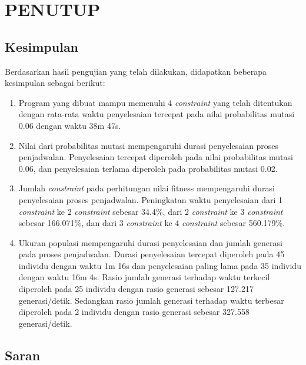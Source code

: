 \chapter{PENUTUP}
\label{chap:penutup}


\section{Kesimpulan}
\label{sec:kesimpulan}

Berdasarkan hasil pengujian yang telah dilakukan, didapatkan beberapa kesimpulan \linebreak sebagai berikut:

\begin{enumerate}[nolistsep]

  \item Program yang dibuat mampu memenuhi 4 \textit{\textit{constraint}} yang telah ditentukan dengan rata-rata waktu penyelesaian tercepat pada nilai probabilitas mutasi 0.06 dengan waktu 38m 47s.
  \item Nilai dari probabilitas mutasi mempengaruhi durasi penyelesaian proses penjadwalan. 
        Penyelesaian tercepat diperoleh pada nilai probabilitas mutasi 0.06, dan penyelesaian terlama diperoleh pada probabilitas mutasi 0.02. 
  \item Jumlah \textit{constraint} pada perhitungan nilai fitness mempengaruhi durasi penyelesaian \linebreak proses penjadwalan. 
        Peningkatan waktu penyelesaian dari 1 \textit{constraint} ke 2 \textit{constraint} sebesar 34.4\%, 
        dari 2 \textit{constraint} ke 3 \textit{constraint} sebesar 166.071\%, 
        dan dari 3 \textit{constraint} ke 4 \textit{constraint} sebesar 560.179\%.
  \item Ukuran populasi mempengaruhi durasi penyelesaian dan jumlah generasi pada proses penjadwalan.
        Durasi penyelesaian tercepat diperoleh pada 45 individu dengan waktu 1m 16s dan penyelesaian paling lama pada 35 individu dengan waktu 16m 4s.
        Rasio jumlah generasi terhadap waktu terkecil diperoleh pada 25 individu dengan rasio generasi sebesar 127.217 generasi/detik.
        Sedangkan rasio jumlah generasi terhadap waktu terbesar diperoleh pada 2 individu dengan rasio generasi sebesar 327.558 generasi/detik.

\end{enumerate}

\section{Saran}
\label{chap:saran}

